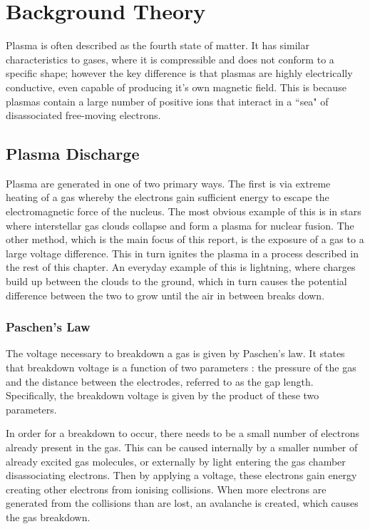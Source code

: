 \chapter{Background Theory}

\label{ch:background}

Plasma is often described as the fourth state of matter. It has similar characteristics to gases, where it is compressible and does not conform to a specific shape; however the key difference is that plasmas are highly electrically conductive, even capable of producing it’s own magnetic field. This is because plasmas contain a large number of positive ions that interact in a ``sea" of disassociated free-moving electrons.

\section{Plasma Discharge}

Plasma are generated in one of two primary ways. The first is via extreme heating of a gas whereby the electrons gain sufficient energy to escape the electromagnetic force of the nucleus. The most obvious example of this is in stars where interstellar gas clouds collapse and form a plasma for nuclear fusion. The other method, which is the main focus of this report, is the exposure of a gas to a large voltage difference. This in turn ignites the plasma in a process described in the rest of this chapter. An everyday example of this is lightning, where  charges build up between the clouds to the ground, which in turn causes the potential difference between the two to grow until the air in between breaks down.

\subsection{Paschen's Law}

The voltage necessary to breakdown a gas is given by Paschen's law. It states that breakdown voltage is a function of two parameters \cite{Lieberman2005}: the pressure of the gas and the distance between the electrodes, referred to as the gap length. Specifically, the breakdown voltage is given by the product of these two parameters.

In order for a breakdown to occur, there needs to be a small number of electrons already present in the gas. This can be caused internally by a smaller number of already excited gas molecules, or externally by light entering the gas chamber disassociating electrons. Then by applying a voltage, these electrons gain energy creating other electrons from ionising collisions. When more electrons are generated from the collisions than are lost, an avalanche is created, which causes the gas breakdown.

